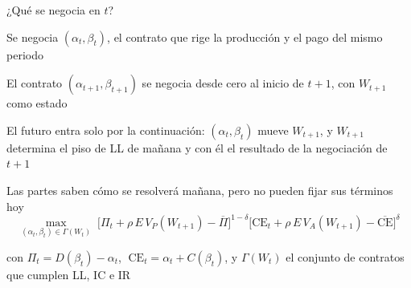 \documentclass[12pt, aspectratio=169]{beamer}
\newenvironment{wideitemize}{\itemize\addtolength{\itemsep}{3pt}}{\enditemize}
\newcommand{\CE}{\text{CE}}
\begin{document}
\begin{frame}{¿Qué se negocia en $t$?}
    \begin{wideitemize}
        \item Se negocia $(\alpha_t,\beta_t)$, el contrato que rige la producción y el pago del mismo periodo
        \item El contrato $(\alpha_{t+1},\beta_{t+1})$ se negocia desde cero al inicio de $t+1$, con $W_{t+1}$ como estado
        \item El futuro entra solo por la continuación: $(\alpha_t,\beta_t)$ mueve $W_{t+1}$, y $W_{t+1}$ determina el piso de LL de mañana y con él el resultado de la negociación de $t+1$
        \item Las partes saben cómo se resolverá mañana, pero no pueden fijar sus términos hoy
    \end{wideitemize}
    \vspace{0.3cm}
    \[
    \max_{(\alpha_t,\beta_t)\in\Gamma(W_t)}\;
    \Big[\Pi_t+\rho\,E\,V_P(W_{t+1})-\overline{\Pi}\Big]^{1-\delta}
    \Big[\CE_t+\rho\,E\,V_A(W_{t+1})-\overline{\CE}\Big]^{\delta}
    \]
    \begin{center}
    {\footnotesize con $\Pi_t=D(\beta_t)-\alpha_t$, $\;\CE_t=\alpha_t+C(\beta_t)$, y $\Gamma(W_t)$ el conjunto de contratos que cumplen LL, IC e IR}
    \end{center}
\end{frame}
\end{document}
